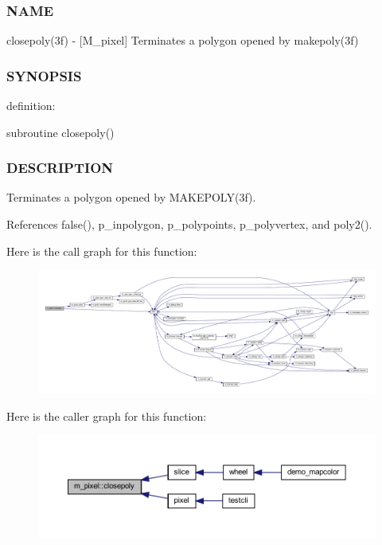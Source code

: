 \subsubsection*{N\+A\+ME}

closepoly(3f) -\/ \mbox{[}M\+\_\+pixel\mbox{]} Terminates a polygon opened by makepoly(3f) 

\subsubsection*{S\+Y\+N\+O\+P\+S\+IS}

definition\+: \begin{DoxyVerb} subroutine closepoly()
\end{DoxyVerb}


\subsubsection*{D\+E\+S\+C\+R\+I\+P\+T\+I\+ON}

Terminates a polygon opened by M\+A\+K\+E\+P\+O\+L\+Y(3f). 

References false(), p\+\_\+inpolygon, p\+\_\+polypoints, p\+\_\+polyvertex, and poly2().

Here is the call graph for this function\+:
\nopagebreak
\begin{figure}[H]
\begin{center}
\leavevmode
\includegraphics[width=350pt]{namespacem__pixel_ab3dc83b63d2ab1bf3f63932abca4245d_cgraph}
\end{center}
\end{figure}
Here is the caller graph for this function\+:
\nopagebreak
\begin{figure}[H]
\begin{center}
\leavevmode
\includegraphics[width=350pt]{namespacem__pixel_ab3dc83b63d2ab1bf3f63932abca4245d_icgraph}
\end{center}
\end{figure}
\mbox{\label{namespacem__pixel_a334bde41bc7b2db19b950b1271ba7463}} 
